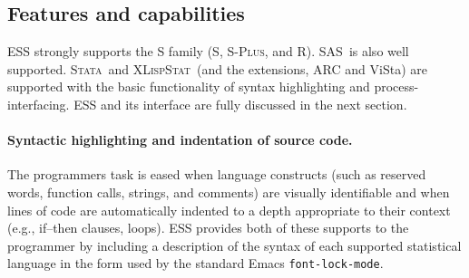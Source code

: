 \documentclass{article}
\newcommand*{\SAS}{\textsc{SAS}}
\newcommand*{\Splus}{\textsc{S-Plus}}
\newcommand*{\XLispStat}{\textsc{XLispStat}}
\newcommand*{\Stata}{\textsc{Stata}}
\newcommand{\stexttt}[1]{{\small\texttt{#1}}}
\begin{document}




\subsection{Features and capabilities}
\label{sec:ESS:features}

ESS strongly supports the S family (S, \Splus, and R).
\SAS\ is also well supported.  \Stata\
and \XLispStat\ (and the extensions, ARC and ViSta) are
supported with the basic functionality of syntax highlighting and
process-interfacing.  ESS and its interface are fully discussed in the
next section.

\paragraph{Syntactic highlighting and indentation of source code.}
The programmers task is eased when language constructs (such as
reserved words, function calls, strings, and comments) are visually
identifiable and when lines of code are automatically indented to a
depth appropriate to their context (e.g., if--then clauses, loops).
ESS provides both of these supports to the programmer by
including a description of the syntax of each
supported statistical language in the form used by the standard Emacs
\stexttt{font-lock-mode}.  
\end{document}
